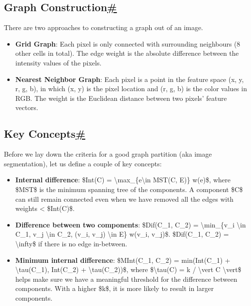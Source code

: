 \subsection{\texorpdfstring{Graph Construction\hyperref[graph-construction]{\#}}{Graph Construction\#}}\label{graph-construction}

There are two approaches to constructing a graph out of an image.

\begin{itemize}
\tightlist
\item
  \textbf{Grid Graph}: Each pixel is only connected with surrounding neighbours (8 other cells in total). The edge weight is the absolute difference between the intensity values of the pixels.
\item
  \textbf{Nearest Neighbor Graph}: Each pixel is a point in the feature space (x, y, r, g, b), in which (x, y) is the pixel location and (r, g, b) is the color values in RGB. The weight is the Euclidean distance between two pixels' feature vectors.
\end{itemize}

\subsection{\texorpdfstring{Key Concepts\hyperref[key-concepts]{\#}}{Key Concepts\#}}\label{key-concepts}

Before we lay down the criteria for a good graph partition (aka image segmentation), let us define a couple of key concepts:

\begin{itemize}
\tightlist
\item
  \textbf{Internal difference}: \$Int(C) = \textbackslash max\_\{e\textbackslash in MST(C, E)\} w(e)\$, where \$MST\$ is the minimum spanning tree of the components. A component \$C\$ can still remain connected even when we have removed all the edges with weights \textless{} \$Int(C)\$.
\item
  \textbf{Difference between two components}: \$Dif(C\_1, C\_2) = \textbackslash min\_\{v\_i \textbackslash in C\_1, v\_j \textbackslash in C\_2, (v\_i, v\_j) \textbackslash in E\} w(v\_i, v\_j)\$. \$Dif(C\_1, C\_2) = \textbackslash infty\$ if there is no edge in-between.
\item
  \textbf{Minimum internal difference}: \$MInt(C\_1, C\_2) = min(Int(C\_1) + \textbackslash tau(C\_1), Int(C\_2) + \textbackslash tau(C\_2))\$, where \$\textbackslash tau(C) = k / \textbackslash vert C \textbackslash vert\$ helps make sure we have a meaningful threshold for the difference between components. With a higher \$k\$, it is more likely to result in larger components.
\end{itemize}

